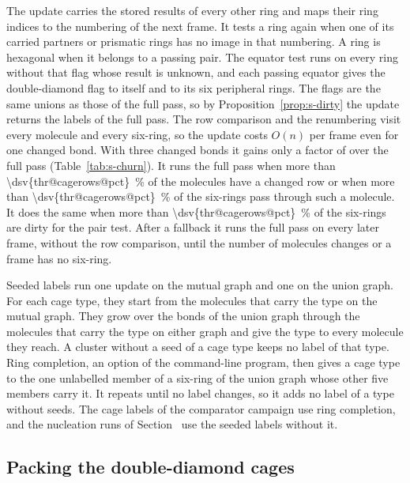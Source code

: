 \documentclass[preprint,12pt]{elsarticle}
\begin{document}
The update carries the stored results of every other ring and maps their ring indices to the numbering of the next frame.
It tests a ring again when one of its carried partners or prismatic rings has no image in that numbering.
A ring is hexagonal when it belongs to a passing pair.
The equator test runs on every ring without that flag whose result is unknown, and each passing equator gives the double-diamond flag to itself and to its six peripheral rings.
The flags are the same unions as those of the full pass, so by Proposition~\ref{prop:s-dirty} the update returns the labels of the full pass.
The row comparison and the renumbering visit every molecule and every six-ring, so the update costs $O(n)$ per frame even for one changed bond.
With three changed bonds it gains only a factor of  over the full pass (Table~\ref{tab:s-churn}).
It runs the full pass when more than \qty{\dsv{thr@cagerows@pct}}{\percent} of the molecules have a changed row or when more than \qty{\dsv{thr@cagerows@pct}}{\percent} of the six-rings pass through such a molecule.
It does the same when more than \qty{\dsv{thr@cagerows@pct}}{\percent} of the six-rings are dirty for the pair test.
After a fallback it runs the full pass on every later frame, without the row comparison, until the number of molecules changes or a frame has no six-ring.

Seeded labels run one update on the mutual graph and one on the union graph.
For each cage type, they start from the molecules that carry the type on the mutual graph.
They grow over the bonds of the union graph through the molecules that carry the type on either graph and give the type to every molecule they reach.
A cluster without a seed of a cage type keeps no label of that type.
Ring completion, an option of the command-line program, then gives a cage type to the one unlabelled member of a six-ring of the union graph whose other five members carry it.
It repeats until no label changes, so it adds no label of a type without seeds.
The cage labels of the comparator campaign use ring completion, and the nucleation runs of Section~ use the seeded labels without it.

\subsection{Packing the double-diamond cages}
\label{sec:s-packing}
\end{document}
